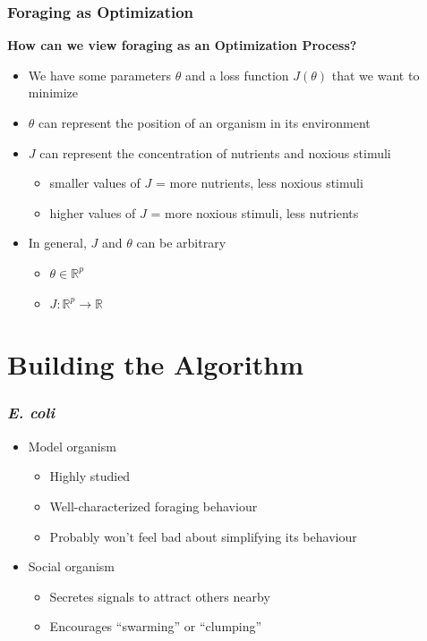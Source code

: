 \documentclass{beamer}
\begin{document}
\begin{frame}
\frametitle{Foraging as Optimization}
\textbf{How can we view foraging as an Optimization Process?}
\begin{itemize}
  \item<1-> We have some parameters $\theta$ and a loss function $J(\theta)$ that we want to minimize
  \item<2-> $\theta$ can represent the position of an organism in its environment
  \item<3-> $J$ can represent the concentration of nutrients and noxious stimuli
  \begin{itemize}
    \item smaller values of $J$ = more nutrients, less noxious stimuli
    \item higher values of $J$ = more noxious stimuli, less nutrients
  \end{itemize}
  \item<4-> In general, $J$ and $\theta$ can be arbitrary
  \begin{itemize}
    \item $\theta \in \mathbb{R}^p$
    \item $J: \mathbb{R}^p \to \mathbb{R}$
  \end{itemize}
\end{itemize}
\end{frame}

\section{Building the Algorithm}
\begin{frame}
\frametitle{\textit{E. coli}}
\begin{itemize}
  \item<1-> Model organism
  \begin{itemize}
    \item<1-> Highly studied
    \item<1-> Well-characterized foraging behaviour
    \item<1-> Probably won't feel bad about simplifying its behaviour
  \end{itemize}
  \item<2-> Social organism
  \begin{itemize}
    \item<2-> Secretes signals to attract others nearby
    \item<2-> Encourages ``swarming'' or ``clumping''
  \end{itemize}
\end{itemize}
\end{frame}
\end{document}
